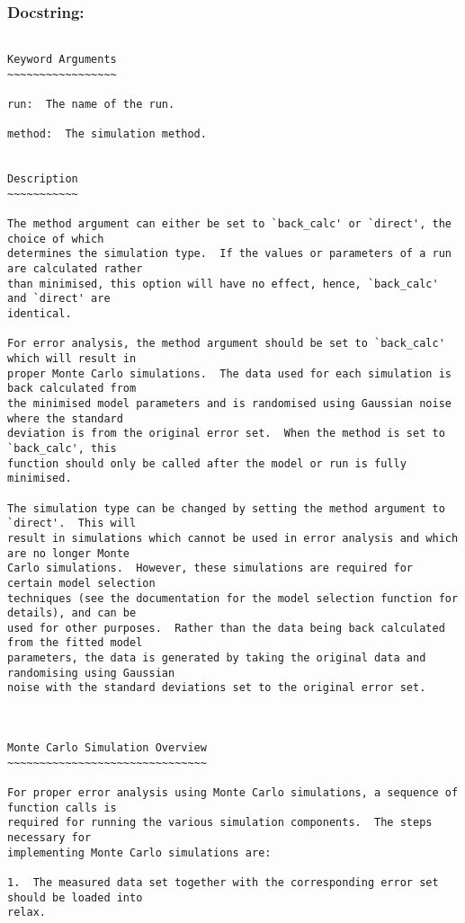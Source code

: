 \subsubsection{Docstring:}

{\scriptsize
\begin{verbatim}

Keyword Arguments
~~~~~~~~~~~~~~~~~

run:  The name of the run.

method:  The simulation method.


Description
~~~~~~~~~~~

The method argument can either be set to `back_calc' or `direct', the choice of which
determines the simulation type.  If the values or parameters of a run are calculated rather
than minimised, this option will have no effect, hence, `back_calc' and `direct' are
identical.

For error analysis, the method argument should be set to `back_calc' which will result in
proper Monte Carlo simulations.  The data used for each simulation is back calculated from
the minimised model parameters and is randomised using Gaussian noise where the standard
deviation is from the original error set.  When the method is set to `back_calc', this
function should only be called after the model or run is fully minimised.

The simulation type can be changed by setting the method argument to `direct'.  This will
result in simulations which cannot be used in error analysis and which are no longer Monte
Carlo simulations.  However, these simulations are required for certain model selection
techniques (see the documentation for the model selection function for details), and can be
used for other purposes.  Rather than the data being back calculated from the fitted model
parameters, the data is generated by taking the original data and randomising using Gaussian
noise with the standard deviations set to the original error set.



Monte Carlo Simulation Overview
~~~~~~~~~~~~~~~~~~~~~~~~~~~~~~~

For proper error analysis using Monte Carlo simulations, a sequence of function calls is
required for running the various simulation components.  The steps necessary for
implementing Monte Carlo simulations are:

1.  The measured data set together with the corresponding error set should be loaded into
relax.


\end{verbatim}}
